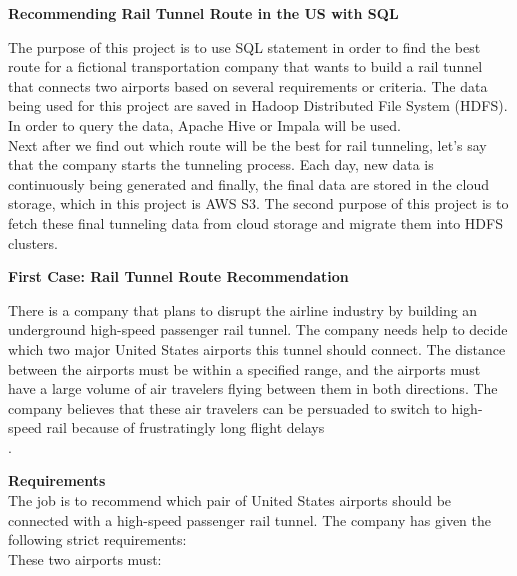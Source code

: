 \documentclass[a4paper,
							12pt,
							oneside,
							openright,
							DIV10,
							numbers=noendperiod
							]{scrreprt} %
\begin{document}
\begin{Large}
\begin{center}
\textbf{Recommending Rail Tunnel Route in the US with SQL}
\end{center}
\end{Large}


\noindent
The purpose of this project is to use SQL statement in order to find the best route for a fictional transportation company that wants to build a rail tunnel that connects two airports based on several requirements or criteria. The data being used for this project are saved in Hadoop Distributed File System (HDFS). In order to query the data, Apache Hive or Impala will be used. \\

\noindent
Next after we find out which route will be the best for rail tunneling, let's say that the company starts the tunneling process. Each day, new data is continuously being generated and finally, the final data are stored in the cloud storage, which in this project is AWS S3. The second purpose of this project is to fetch these final tunneling data from cloud storage and migrate them into HDFS clusters.

 
\begin{Large}
\begin{center}
\textbf{First Case: Rail Tunnel Route Recommendation}
\end{center}
\end{Large}

\noindent
There is a company that plans to disrupt the airline industry by building an underground high-speed passenger rail tunnel. The company needs help to decide which two major United States airports this tunnel should connect. The distance between the airports must be within a specified range, and the airports must have a large volume of air travelers flying between them in both directions. The company believes that these air travelers can be persuaded to switch to high-speed rail because of frustratingly long flight delays\\.

\noindent
\textbf{Requirements}\\

\noindent
The job is to recommend which pair of United States airports should be connected with a high-speed passenger rail tunnel. The company has given the following strict requirements:\\

\noindent
These two airports must:
\end{document}
